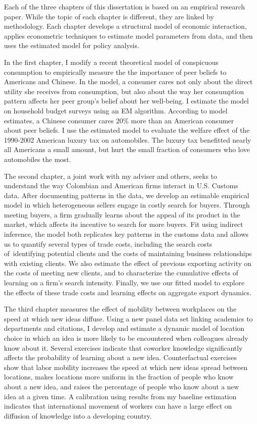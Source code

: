 
Each of the three chapters of this dissertation is based on an empirical research paper.  While the topic of each chapter is different, they are linked by methodology.  Each chapter develops a structural model of economic interaction, applies econometric techniques to estimate model parameters from data, and then uses the estimated model for policy analysis.

In the first chapter, I modify a recent theoretical model of conspicuous consumption to empirically measure the the importance of peer beliefs to Americans and Chinese.  In the model, a consumer cares not only about the direct utility she receives from consumption, but also about the way her consumption pattern affects her peer group's belief about her well-being.  I estimate the model on household budget surveys using an EM algorithm. According to model estimates, a Chinese consumer cares 20\% more than an American consumer about peer beliefs.  I use the estimated model to evaluate the welfare effect of the 1990-2002 American luxury tax on automobiles.  The luxury tax benefitted nearly all Americans a small amount, but hurt the small fraction of consumers who love automobiles the most.

The second chapter, a joint work with my adviser and others, seeks to understand the way Colombian and American firms interact in U.S. Customs data.  After documenting patterns in the data, we develop an estimable empirical model in which heterogeneous sellers engage in costly search for buyers.  Through meeting buyers, a firm gradually learns about the appeal of its product in the market, which affects its incentive to search for more buyers.  Fit using indirect inference, the model both replicates key patterns in the customs data and allows us to quantify several types of trade costs, including the search costs of\ identifying potential clients and the costs of maintaining business relationships with existing clients. We also estimate the effect of previous exporting activity on the costs of meeting new clients, and to characterize the cumulative effects of learning on a firm's search intensity. Finally, we use our fitted model to explore the effects of these trade costs and learning effects on aggregate export dynamics.

The third chapter measures the effect of mobility between workplaces on the speed at which new ideas diffuse.  Using a new panel data set linking academics to departments and citations, I develop and estimate a dynamic model of location choice in which an idea is more likely to be encountered when colleagues already know about it.  Several exercises indicate that coworker knowledge significantly affects the probability of learning about a new idea.  Counterfactual exercises show that labor mobility increases the speed at which new ideas spread between locations, makes locations more uniform in the fraction of people who know about a new idea, and raises the percentage of people who know about a new idea at a given time.  A calibration using results from my baseline estimation indicates that international movement of workers can have a large effect on diffusion of knowledge into a developing country.

